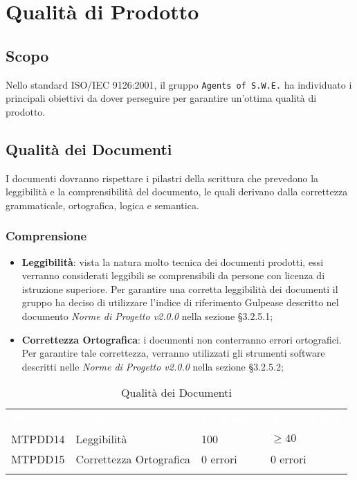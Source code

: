 \section{Qualità di Prodotto}
\label{qualitaProdotto}

\subsection{Scopo}

Nello standard ISO/IEC 9126:2001, il gruppo \texttt{Agents of S.W.E.} ha individuato i principali obiettivi da dover perseguire per garantire un'ottima qualità di prodotto.  

\subsection{Qualità dei Documenti}

I documenti dovranno rispettare i pilastri della scrittura che prevedono la leggibilità e la comprensibilità del documento, le quali derivano dalla correttezza grammaticale, ortografica, logica e semantica.

\subsubsection{Comprensione}

\begin{itemize}
	\item \textbf{Leggibilità}: vista la natura molto tecnica dei documenti prodotti, essi verranno considerati leggibili se comprensibili da persone con licenza di istruzione superiore. Per garantire una corretta leggibilità dei documenti il gruppo ha deciso di utilizzare l'indice di riferimento Gulpease descritto nel documento \textit{Norme di Progetto v2.0.0} nella sezione §3.2.5.1;
	
	\item \textbf{Correttezza Ortografica}: i documenti non conterranno errori ortografici. Per garantire tale correttezza, verranno utilizzati gli strumenti software descritti nelle \textit{Norme di Progetto v2.0.0} nella sezione §3.2.5.2;
	
\end{itemize}

\begin{longtable}{|C{.15\textwidth}|C{.24\textwidth}|C{.24\textwidth}|C{.24\textwidth}|}
\hline
{}\textbf{\textcolor{white}{ID}} & \textbf{\textcolor{white}{Nome}} & \textbf{\textcolor{white}{Ottimalità}} & \textbf{\textcolor{white}{Accettabilità}}\\
MTPDD14 & Leggibilità & 100 & $\geq 40$ \\
\hline
{}MTPDD15 & Correttezza Ortografica & 0 errori & 0 errori \\ 
\hline
\caption{Qualità dei Documenti}
\label{QualitàDocumenti}
\end{longtable}


